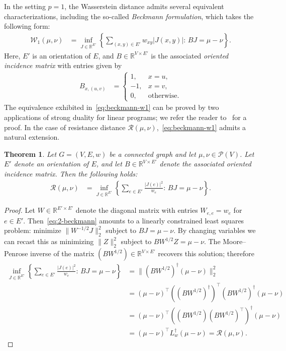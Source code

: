 \documentclass[11pt,a4paper]{article}
\newcommand{\Wass}{\mathcal{W}}
\newcommand{\Resis}{\mathcal{R}}
\newcommand{\Prob}{\mathscr{P}}
\newtheorem{theorem}{Theorem}[section]
\begin{document}
In the setting $p=1$, the Wasserstein distance admits several equivalent characterizations, including the so-called \emph{Beckmann formulation}, which takes the following form:
    \begin{align}\label{eq:beckmann-w1}
        \Wass_{1}(\mu,\nu) &= \inf_{J\in\mathbb{R}^{E'}} \left\{\sum_{(x, y)\in E'} w_{xy} |J(x,y)|:\, B J = \mu - \nu \right\}.
    \end{align}
Here, $E'$ is an orientation of $E$, and $B\in\mathbb{R}^{V\times E'}$ is the associated \emph{oriented incidence matrix} with entries given by
    \begin{align*}
        B_{x, (u,v)} &= \begin{cases}
            1,& x=u,\\
            -1,& x=v,\\
            0,& \text{otherwise}.
        \end{cases}
    \end{align*}
The equivalence exhibited in~\cref{eq:beckmann-w1} can be proved by two applications of strong duality for linear programs; we refer the reader to~\cite[Ch. 6]{peyre2019computational} for a proof. In the case of resistance distance $\Resis(\mu,\nu)$,~\cref{eq:beckmann-w1} admits a natural extension.

\begin{theorem}\label{thm:beckmann}
    Let $G=(V,E,w)$ be a connected graph and let $\mu,\nu\in\Prob(V)$. Let $E'$ denote an orientation of $E$, and let $B\in\mathbb{R}^{V\times E'}$ denote the associated oriented incidence matrix. Then the following holds:
        \begin{align}\label{eq:2-beckmann}
            \Resis(\mu,\nu) &= \inf_{J\in\mathbb{R}^{E'}} \left\{\sum_{e\in E'} \frac{|J(e)|^2}{w_{e}}:\, B J = \mu - \nu \right\}.
        \end{align}
\end{theorem}

\begin{proof}
    Let $W\in\mathbb{R}^{E'\times E'}$ denote the diagonal matrix with entries $W_{e,e} = w_e$ for $e\in E'$. Then~\cref{eq:2-beckmann} amounts to a linearly constrained least squares problem: minimize $\|W^{-1/2} J\|_{2}^{2}$ subject to $ B J = \mu - \nu$. By changing variables we can recast this as minimizing $\|Z\|_{2}^{2}$ subject to $ B W^{1/2} Z = \mu - \nu$. The Moore--Penrose inverse of the matrix $(BW^{1/2})\in\mathbb{R}^{V\times E'}$ recovers this solution; therefore
        \begin{align*}
            \inf_{J\in\mathbb{R}^{E'}} \left\{\sum_{e\in E'} \frac{|J(e)|^2}{w_{e}}:\, B J = \mu - \nu \right\} &= \| (B W^{1/2})^\dagger (\mu-\nu) \|_2^2\\
            &=  (\mu-\nu)^\top ((B W^{1/2})^\dagger)^\top  (B W^{1/2})^\dagger (\mu-\nu)\\
            &=  (\mu-\nu)^\top ((B W^{1/2}) (B W^{1/2})^\top )^\dagger (\mu-\nu)\\
            &=  (\mu-\nu)^\top L_w^\dagger (\mu-\nu) = \Resis(\mu,\nu).
        \end{align*}
\end{proof}
\end{document}
